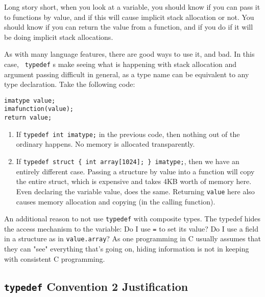 \documentclass[11pt,onecolumn]{article}
\newcommand{\head}[1]{\vspace{0.4em}\noindent{\bf #1}}
\begin{document}
    Long story short, when you look at a variable, you should know if
    you can pass it to functions by value, and if this will cause
    implicit stack allocation or not.  You should know if you can
    return the value from a function, and if you do if it will be
    doing implicit stack allocations.

    \head{{\tt typedef}s gone wrong.}  As with many language features,
    there are good ways to use it, and bad.  In this case, {\tt
      typedef} s make seeing what is happening with stack allocation
    and argument passing difficult in general, as a type name can be
    equivalent to any type declaration.  Take the following code:

    \begin{minipage}{3in}
      \footnotesize
      \lstset{language=C}
      \begin{lstlisting}
imatype value;
imafunction(value);
return value;
      \end{lstlisting}
    \end{minipage}

    \begin{enumerate}[itemsep=0pt,topsep=1pt,parsep=1pt,leftmargin=1.5em]
    \item If {\tt typedef int imatype;} in the previous code, then
      nothing out of the ordinary happens.  No memory is allocated
      transparently.
    \item If {\tt typedef struct \{ int array[1024]; \} imatype;}, then we have
      an entirely different case.  Passing a structure by value into
      a function will copy the entire struct, which is expensive and
      takes 4KB worth of memory here.  Even declaring the variable
      value, does the same.  Returning {\tt value} here also causes
      memory allocation and copying (in the calling function).
    \end{enumerate}

    An additional reason to not use {\tt typedef} with composite
    types.  The typedef hides the access mechanism to the variable: Do
    I use {\tt =} to set its value?  Do I use a field in a structure
    as in {\tt value.array}?  As one programming in C usually assumes
    that they can "see" everything that's going on, hiding information
    is not in keeping with consistent C programming.
    
\subsection{{\tt typedef} Convention 2 Justification}
\end{document}

